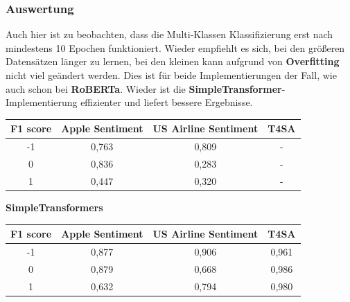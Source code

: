 \subsubsection*{Auswertung}
Auch hier ist zu beobachten, dass die Multi-Klassen Klassifizierung erst nach mindestens 10 Epochen funktioniert. Wieder empfiehlt es sich, bei den gr\"o{\ss}eren Datens\"atzen l\"anger zu lernen, bei den kleinen kann aufgrund von \textbf{Overfitting} nicht viel ge\"andert werden. Dies ist f\"ur beide Implementierungen der Fall, wie auch schon bei \textbf{RoBERTa}. Wieder ist die \textbf{SimpleTransformer}-Implementierung effizienter und liefert bessere Ergebnisse.
\begin{center}
\begin{tabular}{|c||c|c|c|}
\hline
F1 score & Apple Sentiment & US Airline Sentiment & T4SA\\ 
\hline\hline
-1 & 0,763 & 0,809 & -\\
\hline
0 & 0,836 & 0,283 & -\\ 
\hline
1 & 0,447 & 0,320 & -\\
\hline    
\end{tabular}
\end{center}
\textbf{SimpleTransformers}
\begin{center}
\begin{tabular}{|c||c|c|c|}
\hline
F1 score & Apple Sentiment & US Airline Sentiment & T4SA\\ 
\hline\hline
-1 & 0,877 & 0,906 & 0,961\\
\hline
0 & 0,879 & 0,668 & 0,986\\ 
\hline
1 & 0,632 & 0,794 & 0,980\\
\hline    
\end{tabular}
\end{center}

